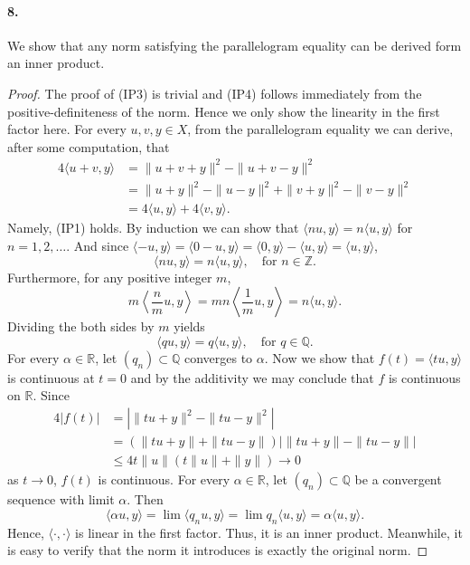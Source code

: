   \paragraph{8.}
    We show that any norm satisfying the parallelogram equality can be derived
    form an inner product.
  \begin{proof}
    The proof of (IP3) is trivial and (IP4) follows immediately from the
    positive-definiteness of the norm. Hence we only show the linearity in the
    first factor here. For every $u, v, y\in X$, from the parallelogram equality
    we can derive, after some computation, that
    \begin{align*}
      4\langle u+v, y\rangle &= \|u+v+y\|^2-\|u+v-y\|^2  \\
      &= \|u+y\|^2-\|u-y\|^2+\|v+y\|^2-\|v-y\|^2 \\
      &= 4\langle u, y\rangle + 4\langle v, y\rangle.
    \end{align*}
    Namely, (IP1) holds. By induction we can show that $\langle nu, y\rangle=
    n\langle u, y\rangle$ for $n=1,2,\dots$. And since $\langle -u, y\rangle =
    \langle 0-u, y\rangle = \langle 0, y\rangle - \langle u, y\rangle = \langle
    u, y\rangle$, 
    \[
      \langle nu, y\rangle = n\langle u, y\rangle,
      \quad\text{for $n\in\mathbb{Z}$}.
    \]
    Furthermore, for any positive integer $m$,
    \[
      m\left\langle\frac{n}{m}u, y\right\rangle = 
      mn\left\langle\frac{1}{m}u, y\right\rangle =
      n\langle u, y\rangle.
    \]
    Dividing the both sides by $m$ yields
    \[
      \langle qu, y\rangle = q\langle u, y\rangle,
      \quad\text{for $q\in\mathbb{Q}$}.
    \]
    For every $\alpha\in\mathbb{R}$, let $(q_n)\subset\mathbb{Q}$ converges to
    $\alpha$. Now we show that $f(t)=\langle tu, y\rangle$ is continuous at $t=
    0$ and by the additivity we may conclude that $f$ is continuous on
    $\mathbb{R}$. Since
    \begin{align*}
      4|f(t)| 
      &= |\|tu+y\|^2 - \|tu-y\|^2| \\
      &= (\|tu+y\|+\|tu-y\|)|\|tu+y\|-\|tu-y\|| \\
      &\le 4t\|u\|(t\|u\|+\|y\|) \to 0
    \end{align*}
    as $t\to 0$, $f(t)$ is continuous. For every $\alpha\in\mathbb{R}$, let 
    $(q_n)\subset\mathbb{Q}$ be a convergent sequence with limit $\alpha$. Then
    \[
      \langle\alpha u, y\rangle=
      \lim\langle q_nu, y\rangle=
      \lim q_n\langle u, y\rangle=
      \alpha\langle u, y\rangle.
    \]
    Hence, $\langle\cdot,\cdot\rangle$ is linear in the first factor. Thus, it
    is an inner product. Meanwhile, it is easy to verify that the norm it 
    introduces is exactly the original norm. 
  \end{proof}





















